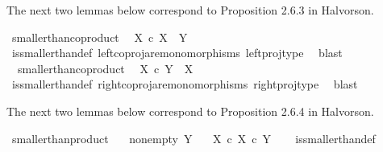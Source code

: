\begin{isabellebody}
\isadelimproof
%
\endisadelimproof
%
\begin{isamarkuptext}%
The next two lemmas below correspond to Proposition 2.6.3 in Halvorson.%
\end{isamarkuptext}\isamarkuptrue%
\isamarkupfalse%
\ smaller{\isacharunderscore}{\kern0pt}than{\isacharunderscore}{\kern0pt}coproduct{}{\isacharcolon}{\kern0pt}\isanewline
\ \ {\isachardoublequoteopen}X\ {\isasymle}\isactrlsub c\ X\ {\isasymCoprod}\ Y{\isachardoublequoteclose}\isanewline
%
\isadelimproof
\ \ %
\endisadelimproof
%
\isatagproof
{}\isamarkupfalse%
\ is{\isacharunderscore}{\kern0pt}smaller{\isacharunderscore}{\kern0pt}than{\isacharunderscore}{\kern0pt}def\ left{\isacharunderscore}{\kern0pt}coproj{\isacharunderscore}{\kern0pt}are{\isacharunderscore}{\kern0pt}monomorphisms\ left{\isacharunderscore}{\kern0pt}proj{\isacharunderscore}{\kern0pt}type\ \isamarkupfalse%
\ blast%
\endisatagproof
{\isafoldproof}%
%
\isadelimproof
\isanewline
%
\endisadelimproof
\isanewline
{}\isamarkupfalse%
\ \ smaller{\isacharunderscore}{\kern0pt}than{\isacharunderscore}{\kern0pt}coproduct{}{\isacharcolon}{\kern0pt}\isanewline
\ \ {\isachardoublequoteopen}X\ {\isasymle}\isactrlsub c\ Y\ {\isasymCoprod}\ X{\isachardoublequoteclose}\isanewline
%
\isadelimproof
\ \ %
\endisadelimproof
%
\isatagproof
{}\isamarkupfalse%
\ is{\isacharunderscore}{\kern0pt}smaller{\isacharunderscore}{\kern0pt}than{\isacharunderscore}{\kern0pt}def\ right{\isacharunderscore}{\kern0pt}coproj{\isacharunderscore}{\kern0pt}are{\isacharunderscore}{\kern0pt}monomorphisms\ right{\isacharunderscore}{\kern0pt}proj{\isacharunderscore}{\kern0pt}type\ \isamarkupfalse%
\ blast%
\endisatagproof
{\isafoldproof}%
%
\isadelimproof
%
\endisadelimproof
%
\begin{isamarkuptext}%
The next two lemmas below correspond to Proposition 2.6.4 in Halvorson.%
\end{isamarkuptext}\isamarkuptrue%
\isamarkupfalse%
\ smaller{\isacharunderscore}{\kern0pt}than{\isacharunderscore}{\kern0pt}product{}{\isacharcolon}{\kern0pt}\isanewline
\ \ \ {\isachardoublequoteopen}nonempty\ Y{\isachardoublequoteclose}\isanewline
\ \ \ {\isachardoublequoteopen}X\ {\isasymle}\isactrlsub c\ X\ {\isasymtimes}\isactrlsub c\ Y{\isachardoublequoteclose}\isanewline
%
\isadelimproof
\ \ %
\endisadelimproof
%
\isatagproof
{}\isamarkupfalse%
\ is{\isacharunderscore}{\kern0pt}smaller{\isacharunderscore}{\kern0pt}than{\isacharunderscore}{\kern0pt}def\ \ \isanewline

\end{isabellebody}
